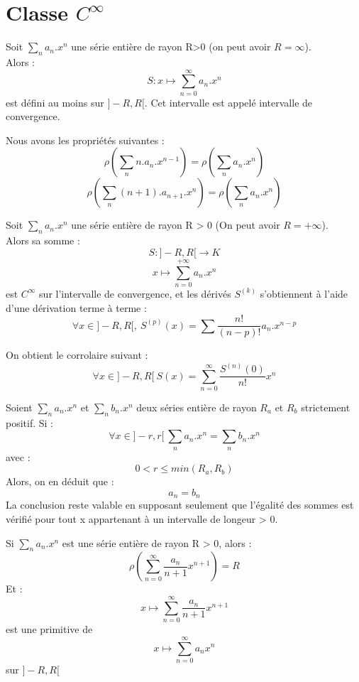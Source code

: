 \section{Classe $C^{\infty}$}
Soit $\underset{n} \sum a_n.x^n$ une série entière de rayon R>0 (on peut avoir $R = \infty$).\\
Alors :
$$S : x \mapsto \sum_{n=0}^{\infty} a_n.x^n$$
est défini au moins sur $]-R,R[$. Cet intervalle est appelé intervalle de convergence.
\begin{prop}
Nous avons les propriétés suivantes : 
$$\rho(\sum_n n.a_n.x^{n-1}) = \rho(\sum_n a_n.x^{n})$$
$$\rho(\sum_n (n+1).a_{n+1}.x^{n}) = \rho(\sum_n a_n.x^{n})$$
\end{prop}
\begin{theo}
Soit $\underset{n} \sum a_n.x^n$ une série entière de rayon R > 0 (On peut avoir $R = +\infty$).\\
Alors sa somme : 
$$S : ]-R,R[ \rightarrow K$$
$$x \mapsto \sum_{n=0}^{+\infty} a_n.x^n$$
est $C^{\infty}$ sur l'intervalle de convergence, et les dérivés $S^{(k)}$ s'obtiennent à l'aide d'une dérivation terme à terme : 
$$\forall x \in ]-R,R[,~ S^{(p)}(x) = \sum \dfrac{n!}{(n-p)!}a_n.x^{n-p}$$
\end{theo}
\begin{corr}
On obtient le corrolaire suivant : 
$$\forall x \in ]-R,R[~ S(x) = \sum_{n=0}^{\infty} \dfrac{S^{(n)}(0)}{n!}x^n$$
\end{corr}
\begin{corr}
Soient $\underset{n} \sum a_n.x^n$ et $\underset{n} \sum b_n.x^n$ deux séries entière de rayon $R_a$ et $R_b$ strictement positif. Si : 
$$\forall x \in ]-r,r[~\underset{n} \sum a_n.x^n = \underset{n} \sum b_n.x^n$$
avec : 
$$0<r\leq min(R_a,R_b)$$
Alors, on en déduit que : 
$$a_n = b_n$$
La conclusion reste valable en supposant seulement que l'égalité des sommes est vérifié pour tout x appartenant à un intervalle de longeur > 0.
\end{corr}
\begin{corr}
Si $\underset{n} \sum a_n.x^n$ est une série entière de rayon R > 0, alors : 
$$\rho(\sum_{n=0}^{\infty}\dfrac{a_n}{n+1}x^{n+1}) = R$$
Et : 
$$x \mapsto \sum_{n=0}^{\infty} \dfrac{a_n}{n+1} x^{n+1}$$
est une primitive de 
$$x \mapsto \sum_{n=0}^{\infty} a_n x^{n}$$
sur $]-R,R[$
\end{corr}
